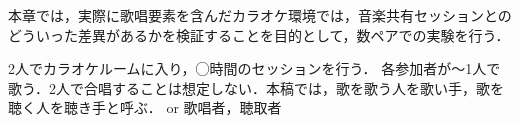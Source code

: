 本章では，実際に歌唱要素を含んだカラオケ環境では，音楽共有セッションとのどういった差異があるかを検証することを目的として，数ペアでの実験を行う．

2人でカラオケルームに入り，◯時間のセッションを行う．
各参加者が～1人で歌う．2人で合唱することは想定しない．本稿では，歌を歌う人を歌い手，歌を聴く人を聴き手と呼ぶ．
or 歌唱者，聴取者